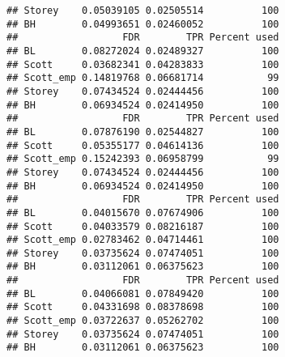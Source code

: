 \documentclass{article}\usepackage[]{graphicx}\usepackage[]{color}
\makeatletter
\newenvironment{kframe}{%
 \def\at@end@of@kframe{}%
 \ifinner\ifhmode%
  \def\at@end@of@kframe{\end{minipage}}%
  \begin{minipage}{\columnwidth}%
 \fi\fi%
 \def\FrameCommand##1{\hskip\@totalleftmargin \hskip-\fboxsep
 \colorbox{shadecolor}{##1}\hskip-\fboxsep
     \hskip-\linewidth \hskip-\@totalleftmargin \hskip\columnwidth}%
 \MakeFramed {\advance\hsize-\width
   \@totalleftmargin\z@ \linewidth\hsize
   \@setminipage}}%
 {\par\unskip\endMakeFramed%
 \at@end@of@kframe}
\newenvironment{knitrout}{}{} %
\makeatother
\begin{document}
\begin{knitrout}
\begin{kframe}
\begin{verbatim}
## Storey    0.05039105 0.02505514          100
## BH        0.04993651 0.02460052          100
##                  FDR        TPR Percent used
## BL        0.08272024 0.02489327          100
## Scott     0.03682341 0.04283833          100
## Scott_emp 0.14819768 0.06681714           99
## Storey    0.07434524 0.02444456          100
## BH        0.06934524 0.02414950          100
##                  FDR        TPR Percent used
## BL        0.07876190 0.02544827          100
## Scott     0.05355177 0.04614136          100
## Scott_emp 0.15242393 0.06958799           99
## Storey    0.07434524 0.02444456          100
## BH        0.06934524 0.02414950          100
##                  FDR        TPR Percent used
## BL        0.04015670 0.07674906          100
## Scott     0.04033579 0.08216187          100
## Scott_emp 0.02783462 0.04714461          100
## Storey    0.03735624 0.07474051          100
## BH        0.03112061 0.06375623          100
##                  FDR        TPR Percent used
## BL        0.04066081 0.07849420          100
## Scott     0.04331698 0.08378698          100
## Scott_emp 0.03722637 0.05262702          100
## Storey    0.03735624 0.07474051          100
## BH        0.03112061 0.06375623          100
\end{verbatim}
\end{kframe}
\end{knitrout}
\end{document}
